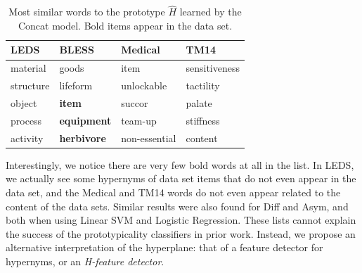 \begin{table}[t]
\begin{center}
  \begin{footnotesize}
  \begin{tabular}{|llll|}
    \hline
    LEDS & BLESS & Medical & TM14\\
    \hline
     material       &      goods             &     item           &      sensitiveness          \\
     structure      &      lifeform          &     unlockable     &      tactility              \\
     object         & {\bf item}             &     succor         &      palate                 \\
     process        & {\bf equipment}        &     team-up        &      stiffness              \\
     activity       & {\bf herbivore}        &     non-essential  &      content                \\
    \hline
  \end{tabular}
  \end{footnotesize}
\end{center}
\caption{Most similar words to the prototype $\hat H$ learned by the Concat model. Bold items
appear in the data set.}
\label{tab:wordsim}
\end{table}

Interestingly, we notice there are very few bold words at all in the list.
In LEDS, we actually see some hypernyms of data set items that do not
even appear in the data set, and the Medical and TM14 words do not even appear
related to the content of the data sets. Similar results were also found for
Diff and Asym, and both when using Linear SVM and Logistic Regression. These
lists cannot explain the success of the prototypicality classifiers
in prior work. Instead, we propose an alternative interpretation of the
hyperplane: that of a feature detector for hypernyms, or an
{\em H-feature detector}.

